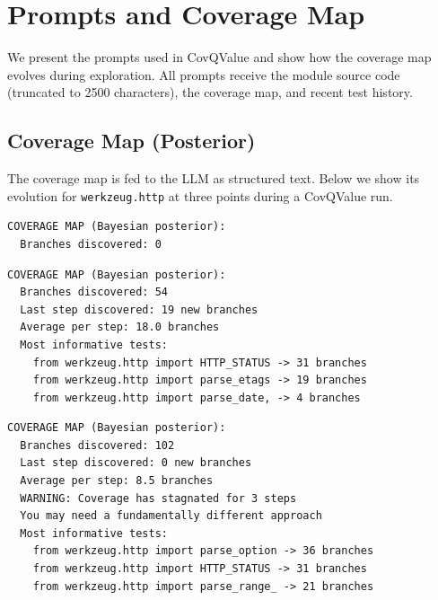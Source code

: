 \section{Prompts and Coverage Map}
\label{app:prompts}

We present the prompts used in CovQValue and show how the coverage map evolves during exploration. All prompts receive the module source code (truncated to 2500 characters), the coverage map, and recent test history.

\subsection{Coverage Map (Posterior)}
\label{app:coverage_map}

The coverage map is fed to the LLM as structured text. Below we show its evolution for \texttt{werkzeug.http} at three points during a CovQValue run.

\begin{tcolorbox}[colback=gray!5!white, colframe=gray!60!black, title=Coverage Map --- Step 1 (initial state), fonttitle=\bfseries\small]
\begin{small}
\begin{verbatim}
COVERAGE MAP (Bayesian posterior):
  Branches discovered: 0
\end{verbatim}
\end{small}
\end{tcolorbox}

\begin{tcolorbox}[colback=gray!5!white, colframe=gray!60!black, title=Coverage Map --- After Step 3 (54 branches), fonttitle=\bfseries\small]
\begin{small}
\begin{verbatim}
COVERAGE MAP (Bayesian posterior):
  Branches discovered: 54
  Last step discovered: 19 new branches
  Average per step: 18.0 branches
  Most informative tests:
    from werkzeug.http import HTTP_STATUS -> 31 branches
    from werkzeug.http import parse_etags -> 19 branches
    from werkzeug.http import parse_date, -> 4 branches
\end{verbatim}
\end{small}
\end{tcolorbox}

\begin{tcolorbox}[colback=red!3!white, colframe=gray!60!black, title=Coverage Map --- After Step 12 (102 branches -- stagnation), fonttitle=\bfseries\small]
\begin{small}
\begin{verbatim}
COVERAGE MAP (Bayesian posterior):
  Branches discovered: 102
  Last step discovered: 0 new branches
  Average per step: 8.5 branches
  WARNING: Coverage has stagnated for 3 steps
  You may need a fundamentally different approach
  Most informative tests:
    from werkzeug.http import parse_option -> 36 branches
    from werkzeug.http import HTTP_STATUS -> 31 branches
    from werkzeug.http import parse_range_ -> 21 branches
\end{verbatim}
\end{small}
\end{tcolorbox}

